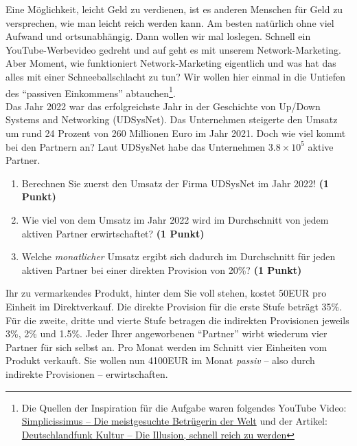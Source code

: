 \documentclass[a4paper, 9pt]{scrartcl}\usepackage[]{graphicx}\usepackage[]{xcolor}
\begin{document}
Eine M{\"o}glichkeit, leicht Geld zu verdienen, ist es anderen Menschen f{\"u}r Geld
zu versprechen, wie man leicht reich werden kann. Am besten nat{\"u}rlich ohne
viel Aufwand und ortsunabh{\"a}ngig. Dann wollen wir mal loslegen. Schnell
ein YouTube-Werbevideo gedreht und auf geht es mit unserem
Network-Marketing. Aber Moment, wie funktioniert Network-Marketing
eigentlich und was hat das alles mit einer Schneeballschlacht zu tun? Wir
wollen hier einmal in die Untiefen des "`passiven Einkommens"'
abtauchen\footnote{Die Quellen der Inspiration f{\"u}r die Aufgabe waren
  folgendes YouTube Video:
  \href{https://youtu.be/UOKkZF_qK9M?si=uf4foJVFKfeQMwSw}{Simplicissimus --
    Die meistgesuchte Betr{\"u}gerin der Welt} und der Artikel:
  \href{https://www.deutschlandfunkkultur.de/netzwerk-marketing-die-illusion-schnell-reich-zu-werden-100.html}{
    Deutschlandfunk Kultur -- Die Illusion, schnell reich zu werden}}.\\

Das Jahr 2022 war das erfolgreichste Jahr in der Geschichte von
Up/Down Systems and Networking (UDSysNet). Das Unternehmen steigerte den Umsatz um rund
24 Prozent von 260 Millionen Euro im Jahr
2021. Doch wie viel kommt bei den Partnern an? Laut
UDSysNet habe das Unternehmen \ensuremath{3.8\times 10^{5}} aktive Partner.

\begin{enumerate}
\item Berechnen Sie zuerst den Umsatz der Firma UDSysNet im
  Jahr 2022! \textbf{(1 Punkt)}
\item Wie viel von dem Umsatz im Jahr 2022 wird im Durchschnitt von jedem
  aktiven Partner erwirtschaftet? \textbf{(1 Punkt)}
\item Welche \textit{monatlicher} Umsatz ergibt sich dadurch im
  Durchschnitt f{\"u}r jeden aktiven Partner bei einer direkten Provision von
  20\%? \textbf{(1 Punkt)}
\end{enumerate}

Ihr zu vermarkendes Produkt, hinter dem Sie voll stehen, kostet
50EUR pro Einheit im Direktverkauf. Die direkte Provision
f{\"u}r die erste Stufe betr{\"a}gt 35\%. F{\"u}r die zweite, dritte und
vierte Stufe betragen die indirekten Provisionen jeweils 3\%,
2\% und 1.5\%. Jeder Ihrer angeworbenen "`Partner"'
wirbt wiederum vier Partner f{\"u}r sich selbst an. Pro Monat
werden im Schnitt vier Einheiten vom Produkt verkauft. Sie wollen nun
4100EUR im Monat \textit{passiv} -- also durch indirekte
Provisionen -- erwirtschaften.
\end{document}
